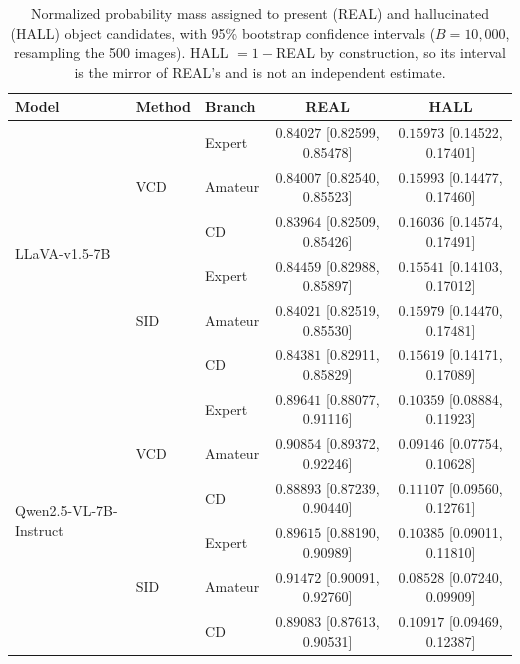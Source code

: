 %
%
%

\begin{table}[H]
\centering
\caption{Normalized probability mass assigned to present (REAL) and
hallucinated (HALL) object candidates, with 95\% bootstrap confidence intervals
($B=10{,}000$, resampling the 500 images). HALL $=1-$REAL by construction, so its
interval is the mirror of REAL's and is not an independent estimate.}
\label{tab:bucket_v3_combined}
\setlength{\tabcolsep}{4pt}
\renewcommand{\arraystretch}{1.15}
\begin{tabular}{lllcc}
\toprule
\textbf{Model} & \textbf{Method} & \textbf{Branch}
& \textbf{REAL} & \textbf{HALL} \\
\midrule
\multirow{6}{*}{LLaVA-v1.5-7B}
& \multirow{3}{*}{VCD} & Expert  & $0.84027$ \tiny{[0.82599, 0.85478]} & $0.15973$ \tiny{[0.14522, 0.17401]} \\
& & Amateur & $0.84007$ \tiny{[0.82540, 0.85523]} & $0.15993$ \tiny{[0.14477, 0.17460]} \\
& & CD      & $0.83964$ \tiny{[0.82509, 0.85426]} & $0.16036$ \tiny{[0.14574, 0.17491]} \\
\cmidrule(lr){2-5}
& \multirow{3}{*}{SID} & Expert  & $0.84459$ \tiny{[0.82988, 0.85897]} & $0.15541$ \tiny{[0.14103, 0.17012]} \\
& & Amateur & $0.84021$ \tiny{[0.82519, 0.85530]} & $0.15979$ \tiny{[0.14470, 0.17481]} \\
& & CD      & $0.84381$ \tiny{[0.82911, 0.85829]} & $0.15619$ \tiny{[0.14171, 0.17089]} \\
\midrule
\multirow{6}{*}{Qwen2.5-VL-7B-Instruct}
& \multirow{3}{*}{VCD} & Expert  & $0.89641$ \tiny{[0.88077, 0.91116]} & $0.10359$ \tiny{[0.08884, 0.11923]} \\
& & Amateur & $0.90854$ \tiny{[0.89372, 0.92246]} & $0.09146$ \tiny{[0.07754, 0.10628]} \\
& & CD      & $0.88893$ \tiny{[0.87239, 0.90440]} & $0.11107$ \tiny{[0.09560, 0.12761]} \\
\cmidrule(lr){2-5}
& \multirow{3}{*}{SID} & Expert  & $0.89615$ \tiny{[0.88190, 0.90989]} & $0.10385$ \tiny{[0.09011, 0.11810]} \\
& & Amateur & $0.91472$ \tiny{[0.90091, 0.92760]} & $0.08528$ \tiny{[0.07240, 0.09909]} \\
& & CD      & $0.89083$ \tiny{[0.87613, 0.90531]} & $0.10917$ \tiny{[0.09469, 0.12387]} \\
\bottomrule
\end{tabular}
\end{table}


